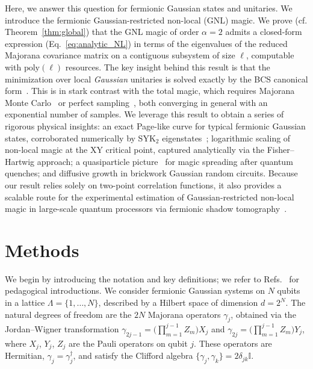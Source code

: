 \documentclass[prx,twocolumn,superscriptaddress,aps,10pt, frontmatterverbose, reprint,footinbib,longbibliography=true]{revtex4-2}
\newcommand{\RENYI}{\alpha}
\providecommand{\DIFaddtex}[1]{{\protect\color{red}#1}} %
\providecommand{\DIFaddbegin}{\protect\color{red}} %
\providecommand{\DIFaddend}{\protect\color{black}} %
\providecommand{\DIFaddtex}[1]{\texorpdfstring{\DIFaddtex{#1}}{#1}} %
\providecommand{\DIFadd}[1]{\texorpdfstring{\DIFaddtex{#1}}{#1}} %
\newcommand{\DIFaddincludegraphics}[2][]{{\color{blue}\fbox{\DIFOincludegraphics[#1]{#2}}}} %
\DeclareRobustCommand{\DIFaddbegin}{\DIFOaddbegin \let\includegraphics\DIFaddincludegraphics} %
\DeclareRobustCommand{\DIFaddend}{\DIFOaddend \let\includegraphics\DIFOincludegraphics} %
\begin{document}
Here, we answer this question for fermionic Gaussian states and unitaries. We introduce the fermionic Gaussian-restricted non-local (GNL) magic.
We prove (cf. Theorem~\ref{thm:global}) that the GNL magic of order $\RENYI=2$ admits a closed-form expression (Eq.~\eqref{eq:analytic_NL}) in terms of the eigenvalues of the reduced Majorana covariance matrix on a \DIFaddbegin \DIFadd{contiguous }\DIFaddend subsystem of size $\ell$, computable with $\mathrm{poly}(\ell)$ resources. 
The key insight behind this result is that the minimization over local \emph{Gaussian} unitaries is solved exactly by the BCS canonical form~\cite{BoteroReznik2004}. 
This is in stark contrast with the total magic, which requires Majorana Monte Carlo~\cite{Bera_2025} or perfect sampling~\cite{collura2026nonstabilizernessfermionicgaussianstates}, both converging in general with an exponential number of samples.
We leverage this result to obtain a series of rigorous physical insights: an exact Page-like curve for typical fermionic Gaussian states, corroborated numerically by SYK$_2$ eigenstates~\cite{Bera_2025,santra2025complexitytransitionschaoticquantum,jasser2025stabilizer, malvimat2026multipartitenonlocalmagicsyk, njgn-fksh}; logarithmic scaling of non-local magic at the XY critical point, captured analytically via the Fisher--Hartwig approach; a quasiparticle picture~\cite{calabrese2009} for magic spreading after quantum quenches; and diffusive growth in brickwork Gaussian random circuits.
Because our result relies solely on two-point correlation functions, it also provides a scalable route for the experimental estimation of Gaussian-restricted non-local magic in large-scale quantum processors via fermionic shadow tomography~\cite{Wan_2023}.

\section{Methods}
\label{sec:methods}
We begin by introducing the notation and key definitions; we refer to Refs.~\cite{Mbeng2024,surace,sierant2026fermionic,sierant2026theorymatchgatecommutant} for pedagogical introductions.
We consider fermionic Gaussian systems on $N$ qubits in a lattice $\Lambda=\{1,\dots, N\}$, described by a Hilbert space of dimension $d=2^N$.
The natural degrees of freedom are the $2N$ Majorana operators $\gamma_j$, obtained via the Jordan--Wigner transformation $\gamma_{2j-1} = \bigl(\prod_{m=1}^{j-1} Z_m\bigr)X_j$ and $\gamma_{2j} = \bigl(\prod_{m=1}^{j-1} Z_m\bigr)Y_j$, where $X_j$, $Y_j$, $Z_j$ are the Pauli operators on qubit $j$.
These operators are Hermitian, $\gamma_j=\gamma_j^\dagger$, and satisfy the Clifford algebra $\lbrace \gamma_j,\gamma_k\}=2 \delta_{jk} \mathbb{I}$.
\end{document}
